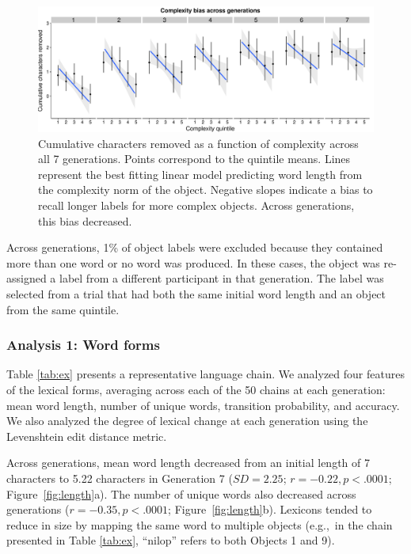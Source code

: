 \begin{figure}[t]
\begin{center}
\includegraphics[scale = .4]{figs/complexity_bias.pdf}
\end{center}
\vspace{-.5em}

\caption{Cumulative characters removed as a function of complexity across all 7 generations. Points correspond to the quintile means. Lines represent the best fitting linear model predicting word length from the complexity norm of the object. Negative slopes indicate a bias to recall longer labels for  more complex objects. Across generations, this bias decreased.}
\label{fig:cbias}
\vspace{-1em}
\end{figure}

Across generations, 1\% of object labels were excluded because they contained more than one word or no word was produced. In these cases, the object was re-assigned a label from a different participant in that generation. The label was selected from a trial that had both the same initial word length and an object from the same quintile. 

\subsubsection{Analysis 1: Word forms}


Table \ref{tab:ex} presents a representative language chain. We analyzed four features of the lexical forms, averaging across each of the 50 chains at each generation: mean word length, number of unique words, transition probability, and accuracy. We also analyzed the degree of lexical change at each generation using the Levenshtein edit distance metric.

Across generations, mean word length decreased from an initial length of 7 characters to 5.22 characters in Generation 7 ($SD= 2.25$; $r=-0.22, p<.0001$; Figure\ \ref{fig:length}a). The number of unique words also decreased across generations ($r=-0.35, p<.0001$; Figure\ \ref{fig:length}b). Lexicons tended to reduce in size by mapping the same word to multiple objects (e.g.,\ in the chain presented in Table \ref{tab:ex}, ``nilop'' refers to both Objects 1 and 9).



